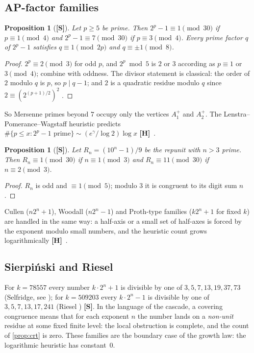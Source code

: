 \documentclass[11pt,a4paper]{article}
\newcommand{\statS}{\textsf{\textbf{[S]}}}
\newcommand{\statH}{\textsf{\textbf{[H]}}}
\theoremstyle{plain}
\newtheorem{proposition}[theorem]{Proposition}
\theoremstyle{definition}
\theoremstyle{remark}
\begin{document}
\subsection{AP-factor families}
\begin{proposition}[\statS]\label{prop:mersenne}
Let $p\ge5$ be prime. Then $2^p-1\equiv1\pmod{30}$ if $p\equiv1\pmod4$ and
$2^p-1\equiv7\pmod{30}$ if $p\equiv3\pmod4$. Every prime factor $q$ of $2^p-1$
satisfies $q\equiv1\pmod{2p}$ and $q\equiv\pm1\pmod8$.
\end{proposition}
\begin{proof}
$2^p\equiv2\pmod3$ for odd $p$, and $2^p\bmod5$ is $2$ or $3$ according as
$p\equiv1$ or $3\pmod4$; combine with oddness. The divisor statement is
classical: the order of $2$ modulo $q$ is $p$, so $p\mid q-1$; and $2$ is a
quadratic residue modulo $q$ since $2\equiv(2^{(p+1)/2})^2$ \cite{HardyWright}.
\end{proof}
So Mersenne primes beyond $7$ occupy only the vertices $A_1^+$ and $A_2^+$.
The Lenstra--Pomerance--Wagstaff heuristic predicts
$\#\{p\le x:2^p-1\text{ prime}\}\sim(e^\gamma/\log2)\log x$ \statH\
\cite{Wagstaff}.

\begin{proposition}[\statS]\label{prop:repunit}
Let $R_n=(10^n-1)/9$ be the repunit with $n>3$ prime. Then
$R_n\equiv1\pmod{30}$ if $n\equiv1\pmod3$ and $R_n\equiv11\pmod{30}$ if
$n\equiv2\pmod3$.
\end{proposition}
\begin{proof}
$R_n$ is odd and $\equiv1\pmod5$; modulo $3$ it is congruent to its digit sum
$n$.
\end{proof}
Cullen ($n2^n+1$), Woodall ($n2^n-1$) and Proth-type families
($k2^n+1$ for fixed $k$) are handled in the same way: a half-axis or a small
set of half-axes is forced by the exponent modulo small numbers, and the
heuristic count grows logarithmically \statH\ \cite{K-atlas}.

\subsection{Sierpi\'{n}ski and Riesel}
For $k=78557$ every number $k\cdot2^n+1$ is divisible by one of
$3,5,7,13,19,37,73$ (Selfridge, see \cite{Sierpinski}); for $k=509203$ every
$k\cdot2^n-1$ is divisible by one of $3,5,7,13,17,241$ (Riesel
\cite{Riesel}) \statS. In the language of the cascade, a covering
congruence means that for each exponent $n$ the number lands on a
\emph{non-unit} residue at some fixed finite level: the local obstruction is
complete, and the count of \cref{prop:crt} is zero. These families are the
boundary case of the growth law: the logarithmic heuristic has constant~$0$.
\end{document}
